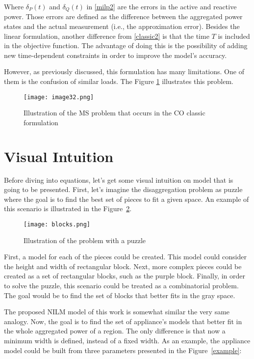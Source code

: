 Where $\delta_P(t)$ and $\delta_Q(t)$ in \eqref{milp2} are the errors in the active and reactive power. Those errors are defined as the difference between the aggregated power states and the actual measurement (i.e., the approximation error). Besides the linear formulation, another difference from \eqref{classic2} is that the time $T$ is included in the objective function. The advantage of doing this is the possibility of adding new time-dependent constraints in order to improve the model's accuracy. 

However, as previously discussed, this formulation has many limitations. One of them is the confusion of similar loads. The Figure \ref{image32} illustrates this problem. 


\begin{figure}[tb]
    \centering
    \texttt{[image: image32.png]}
    \caption{Illustration of the MS problem that occurs in the CO classic formulation}
    \label{image32}
\end{figure}





\section{Visual Intuition}
Before diving into equations, let's get some visual intuition on model that is going to be presented. First, let's imagine the disaggregation problem as puzzle where the goal is to find the best set of pieces to fit a given space. An example of this scenario is illustrated in the Figure~\ref{blocks}. 

\begin{figure}[tb]
    \centering
    \texttt{[image: blocks.png]}
    \caption{Illustration of the problem with a puzzle}
    \label{blocks}
\end{figure}

First, a model for each of the pieces could be created. This model could consider the height and width of rectangular block. Next, more complex pieces could be created as a set of rectangular blocks, such as the purple block. Finally, in order to solve the puzzle, this scenario could be treated as a combinatorial problem. The goal would be to find the set of blocks that better fits in the gray space. 


The proposed NILM model of this work is somewhat similar the very same analogy. Now, the goal is to find the set of appliance's models that better fit in the whole aggregated power of a region. The only difference is that now a minimum width is defined, instead of a fixed width. As an example, the appliance model could be built from three parameters presented in the Figure~\ref{example}: 

